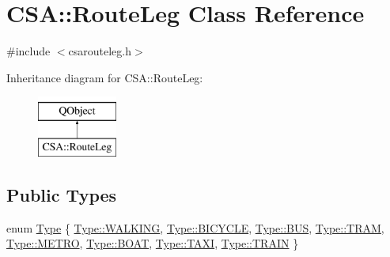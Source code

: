 \hypertarget{classCSA_1_1RouteLeg}{}\section{C\+SA\+:\+:Route\+Leg Class Reference}
\label{classCSA_1_1RouteLeg}


{\ttfamily \#include $<$csarouteleg.\+h$>$}

Inheritance diagram for C\+SA\+:\+:Route\+Leg\+:\begin{figure}[H]
\begin{center}
\leavevmode
\includegraphics[height=2.000000cm]{classCSA_1_1RouteLeg}
\end{center}
\end{figure}
\subsection*{Public Types}
\begin{DoxyCompactItemize}
\item 
enum \mbox{\hyperlink{classCSA_1_1RouteLeg_a464547cf160a77a2014d101560b1f77b}{Type}} \{ \newline
\mbox{\hyperlink{classCSA_1_1RouteLeg_a464547cf160a77a2014d101560b1f77ba606c114184493a665cf1f6a12fbab9d3}{Type\+::\+W\+A\+L\+K\+I\+NG}}, 
\mbox{\hyperlink{classCSA_1_1RouteLeg_a464547cf160a77a2014d101560b1f77ba4bdeeb2e61c16dbc81956e1bd9148809}{Type\+::\+B\+I\+C\+Y\+C\+LE}}, 
\mbox{\hyperlink{classCSA_1_1RouteLeg_a464547cf160a77a2014d101560b1f77ba0e0c9d888d1093cb2dfa6b25cbce19d8}{Type\+::\+B\+US}}, 
\mbox{\hyperlink{classCSA_1_1RouteLeg_a464547cf160a77a2014d101560b1f77ba0d8fcfacbca6d7ab6fa25ebadb85aa88}{Type\+::\+T\+R\+AM}}, 
\newline
\mbox{\hyperlink{classCSA_1_1RouteLeg_a464547cf160a77a2014d101560b1f77bab7c96478c96d5fff50bc14fb2d33e144}{Type\+::\+M\+E\+T\+RO}}, 
\mbox{\hyperlink{classCSA_1_1RouteLeg_a464547cf160a77a2014d101560b1f77ba45341cc1cc5a485ca18fd816b833175b}{Type\+::\+B\+O\+AT}}, 
\mbox{\hyperlink{classCSA_1_1RouteLeg_a464547cf160a77a2014d101560b1f77ba7086a7774c0003961e43955ec716cb9f}{Type\+::\+T\+A\+XI}}, 
\mbox{\hyperlink{classCSA_1_1RouteLeg_a464547cf160a77a2014d101560b1f77bacf72425b33c7bcc6d1692b0793e1a8b1}{Type\+::\+T\+R\+A\+IN}}
 \}
\end{DoxyCompactItemize}
